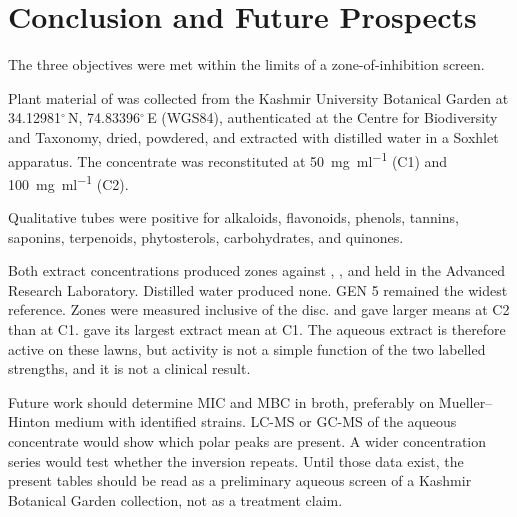 
\chapter{Conclusion and Future Prospects}\label{ch:conclusion}

The three objectives were met within the limits of a zone-of-inhibition screen.

Plant material of  was collected from the Kashmir University Botanical Garden at 34.12981$^{\circ}$\,N, 74.83396$^{\circ}$\,E (WGS84), authenticated at the Centre for Biodiversity and Taxonomy, dried, powdered, and extracted with distilled water in a Soxhlet apparatus. The concentrate was reconstituted at \SI{50}{\milli\gram\per\milli\litre} (C1) and \SI{100}{\milli\gram\per\milli\litre} (C2).

Qualitative tubes were positive for alkaloids, flavonoids, phenols, tannins, saponins, terpenoids, phytosterols, carbohydrates, and quinones.

Both extract concentrations produced zones against , , and  held in the Advanced Research Laboratory. Distilled water produced none. GEN 5 remained the widest reference. Zones were measured inclusive of the disc.  and  gave larger means at C2 than at C1.  gave its largest extract mean at C1. The aqueous extract is therefore active \invitro{} on these lawns, but activity is not a simple function of the two labelled strengths, and it is not a clinical result.

Future work should determine MIC and MBC in broth, preferably on Mueller--Hinton medium with identified strains. LC-MS or GC-MS of the aqueous concentrate would show which polar peaks are present. A wider concentration series would test whether the  inversion repeats. Until those data exist, the present tables should be read as a preliminary aqueous screen of a Kashmir Botanical Garden collection, not as a treatment claim.

\FloatBarrier
